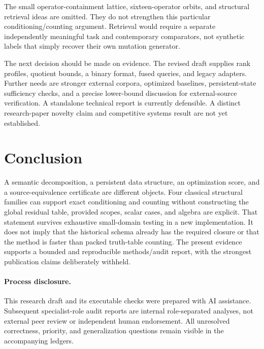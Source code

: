 \documentclass[11pt]{article}
\theoremstyle{definition}\newtheorem{definition}[theorem]{Definition}
\theoremstyle{remark}\newtheorem{remark}[theorem]{Remark}
\begin{document}
The small operator-containment lattice, sixteen-operator orbits, and structural retrieval ideas are omitted. They do not strengthen this particular conditioning/counting argument. Retrieval would require a separate independently meaningful task and contemporary comparators, not synthetic labels that simply recover their own mutation generator.

The next decision should be made on evidence. The revised draft supplies rank profiles, quotient bounds, a binary format, fused queries, and legacy adapters. Further needs are stronger external corpora, optimized baselines, persistent-state sufficiency checks, and a precise lower-bound discussion for external-source verification. A standalone technical report is currently defensible. A distinct research-paper novelty claim and competitive systems result are not yet established.

\section{Conclusion}
A semantic decomposition, a persistent data structure, an optimization score, and a source-equivalence certificate are different objects. Four classical structural families can support exact conditioning and counting without constructing the global residual table, provided scopes, scalar cases, and algebra are explicit. That statement survives exhaustive small-domain testing in a new implementation. It does not imply that the historical schema already has the required closure or that the method is faster than packed truth-table counting. The present evidence supports a bounded and reproducible methods/audit report, with the strongest publication claims deliberately withheld.

\paragraph{Process disclosure.}
This research draft and its executable checks were prepared with AI assistance. Subsequent specialist-role audit reports are internal role-separated analyses, not external peer review or independent human endorsement. All unresolved correctness, priority, and generalization questions remain visible in the accompanying ledgers.


\end{document}
